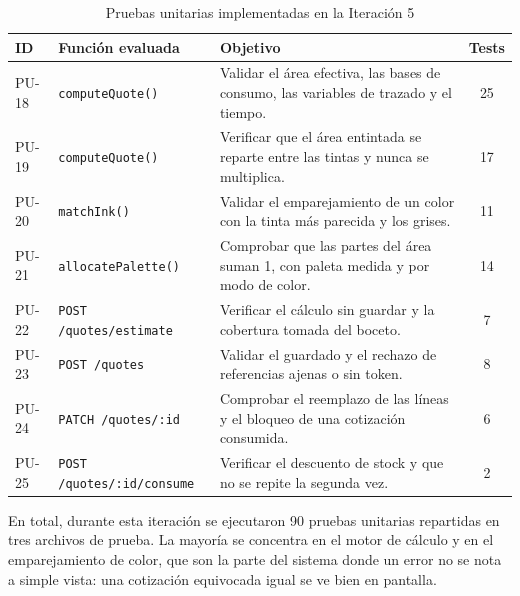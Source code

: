 \documentclass[12pt,letterpaper,oneside]{report}
\begin{document}
\begin{table}[H]
  \centering
  \caption{Pruebas unitarias implementadas en la Iteración 5}
  \label{tab:pruebas5}
  \renewcommand{\arraystretch}{1.2}
  \begin{tabular}{|l|p{3.4cm}|p{6.6cm}|c|}
    \hline
    \textbf{ID} & \textbf{Función evaluada} & \textbf{Objetivo} & \textbf{Tests} \\
    \hline
    PU-18 & \texttt{computeQuote()} & Validar el área efectiva, las bases de consumo, las variables de trazado y el tiempo. & 25 \\ \hline
    PU-19 & \texttt{computeQuote()} & Verificar que el área entintada se reparte entre las tintas y nunca se multiplica. & 17 \\ \hline
    PU-20 & \texttt{matchInk()} & Validar el emparejamiento de un color con la tinta más parecida y los grises. & 11 \\ \hline
    PU-21 & \texttt{allocate\newline Palette()} & Comprobar que las partes del área suman 1, con paleta medida y por modo de color. & 14 \\ \hline
    PU-22 & \texttt{POST /quotes/\newline estimate} & Verificar el cálculo sin guardar y la cobertura tomada del boceto. & 7 \\ \hline
    PU-23 & \texttt{POST /quotes} & Validar el guardado y el rechazo de referencias ajenas o sin token. & 8 \\ \hline
    PU-24 & \texttt{PATCH /quotes/:id} & Comprobar el reemplazo de las líneas y el bloqueo de una cotización consumida. & 6 \\ \hline
    PU-25 & \texttt{POST /quotes/\newline :id/consume} & Verificar el descuento de stock y que no se repite la segunda vez. & 2 \\ \hline
  \end{tabular}
\end{table}

En total, durante esta iteración se ejecutaron 90 pruebas unitarias repartidas en tres archivos de prueba. La mayoría se concentra en el motor de cálculo y en el emparejamiento de color, que son la parte del sistema donde un error no se nota a simple vista: una cotización equivocada igual se ve bien en pantalla.
\end{document}
